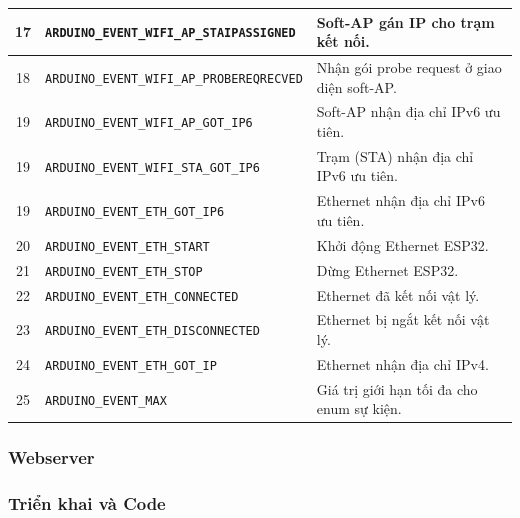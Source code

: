\begin{table}[H]
\begin{tabular}{|c|l|p{7.2cm}|}
		\hline
		17 & \texttt{ARDUINO\_EVENT\_WIFI\_AP\_STAIPASSIGNED} & Soft-AP gán IP cho trạm kết nối. \\
		\hline
		18 & \texttt{ARDUINO\_EVENT\_WIFI\_AP\_PROBEREQRECVED} & Nhận gói probe request ở giao diện soft-AP. \\
		\hline
		19 & \texttt{ARDUINO\_EVENT\_WIFI\_AP\_GOT\_IP6} & Soft-AP nhận địa chỉ IPv6 ưu tiên. \\
		\hline
		19 & \texttt{ARDUINO\_EVENT\_WIFI\_STA\_GOT\_IP6} & Trạm (STA) nhận địa chỉ IPv6 ưu tiên. \\
		\hline
		19 & \texttt{ARDUINO\_EVENT\_ETH\_GOT\_IP6} & Ethernet nhận địa chỉ IPv6 ưu tiên. \\
		\hline
		20 & \texttt{ARDUINO\_EVENT\_ETH\_START} & Khởi động Ethernet ESP32. \\
		\hline
		21 & \texttt{ARDUINO\_EVENT\_ETH\_STOP} & Dừng Ethernet ESP32. \\
		\hline
		22 & \texttt{ARDUINO\_EVENT\_ETH\_CONNECTED} & Ethernet đã kết nối vật lý. \\
		\hline
		23 & \texttt{ARDUINO\_EVENT\_ETH\_DISCONNECTED} & Ethernet bị ngắt kết nối vật lý. \\
		\hline
		24 & \texttt{ARDUINO\_EVENT\_ETH\_GOT\_IP} & Ethernet nhận địa chỉ IPv4. \\
		\hline
		25 & \texttt{ARDUINO\_EVENT\_MAX} & Giá trị giới hạn tối đa cho enum sự kiện. \\
		\hline
	\end{tabular}
\end{table}



\subsubsection{Webserver}



\subsubsection{Triển khai và Code}
